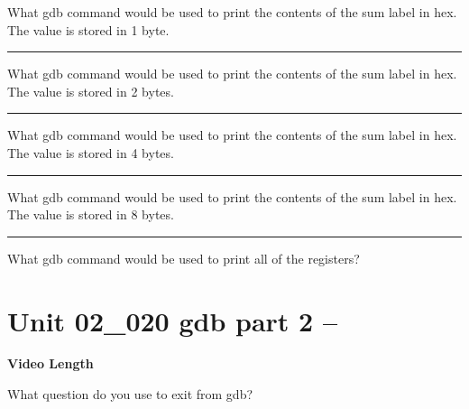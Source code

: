 \documentclass[letterpaper,12pt]{exam}
\newcommand{\unit}{Unit 02}
\begin{document}
\begin{questions}
\begin{samepage}
        \end{samepage}
     \par

     \begin{samepage}
         \question What gdb command would be used to print the contents of the sum label in hex.  The value is stored in 1 byte. \rule{5cm}{0.15mm}
         \vspace{5mm}
     \end{samepage}
     \par
     \begin{samepage}
         \question What gdb command would be used to print the contents of the sum label in hex.  The value is stored in 2 bytes. \rule{5cm}{0.15mm}
         \vspace{5mm}
     \end{samepage}
     \par
     \begin{samepage}
         \question What gdb command would be used to print the contents of the sum label in hex.  The value is stored in 4 bytes. \rule{5cm}{0.15mm}
         \vspace{5mm}
     \end{samepage}
     \par
     \begin{samepage}
         \question What gdb command would be used to print the contents of the sum label in hex.  The value is stored in 8 bytes. \rule{5cm}{0.15mm}
         \vspace{5mm}
     \end{samepage}
     \par
      
     \begin{samepage}
         \question What gdb command would be used to print all of the registers?
         \vspace{5mm}
     \end{samepage}
     \par
      \section*{\unit\_020 gdb part 2 -- }
      \par{\selectfont\textbf{Video Length }}
      \begin{samepage}
          \question What question do you use to exit from gdb?
          \vspace{5mm}
      \end{samepage}
    

\end{questions}
\end{document}

